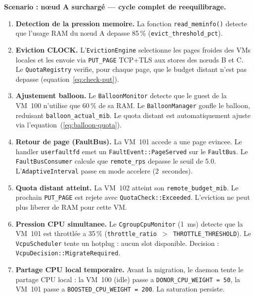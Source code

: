 \textbf{Scenario : n\oe{}ud A surcharg\'e --- cycle complet de reequilibrage.}

\begin{enumerate}
    \item \textbf{Detection de la pression memoire.} La fonction \texttt{read\_meminfo()} detecte que l'usage RAM du n\oe{}ud A depasse 85\,\% (\texttt{evict\_threshold\_pct}).

    \item \textbf{Eviction CLOCK.} L'\texttt{EvictionEngine} selectionne les pages froides des VMs locales et les envoie via \texttt{PUT\_PAGE} TCP+TLS aux stores des n\oe{}uds B et C. Le \texttt{QuotaRegistry} verifie, pour chaque page, que le budget distant n'est pas depasse (equation~\ref{eq:check-put}).

    \item \textbf{Ajustement balloon.} Le \texttt{BalloonMonitor} detecte que le guest de la VM~100 n'utilise que 60\,\% de sa RAM. Le \texttt{BalloonManager} gonfle le balloon, reduisant \texttt{balloon\_actual\_mib}. Le quota distant est automatiquement ajuste via l'equation~(\ref{eq:balloon-quota}).

    \item \textbf{Retour de page (FaultBus).} La VM~101 accede a une page evincee. Le handler \texttt{userfaultfd} emet un \texttt{FaultEvent::PageServed} sur le \texttt{FaultBus}. Le \texttt{FaultBusConsumer} calcule que \texttt{remote\_rps} depasse le seuil de 5.0. L'\texttt{AdaptiveInterval} passe en mode accelere (2~secondes).

    \item \textbf{Quota distant atteint.} La VM~102 atteint son \texttt{remote\_budget\_mib}. Le prochain \texttt{PUT\_PAGE} est rejete avec \texttt{QuotaCheck::Exceeded}. L'eviction ne peut plus liberer de RAM pour cette VM.

    \item \textbf{Pression CPU simultanee.} Le \texttt{CgroupCpuMonitor} (1~ms) detecte que la VM~101 est throttl\'ee a 35\,\% (\texttt{throttle\_ratio $>$ THROTTLE\_THRESHOLD}). Le \texttt{VcpuScheduler} tente un hotplug : aucun slot disponible. Decision : \texttt{VcpuDecision::MigrateRequired}.

    \item \textbf{Partage CPU local temporaire.} Avant la migration, le daemon tente le partage CPU local : la VM~100 (idle) passe a \texttt{DONOR\_CPU\_WEIGHT = 50}, la VM~101 passe a \texttt{BOOSTED\_CPU\_WEIGHT = 200}. La saturation persiste.


\end{enumerate}
